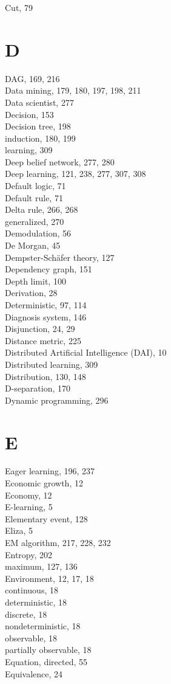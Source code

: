 \documentclass[10pt]{article}
\begin{document}
Cut, 79

\section*{D}
DAG, 169, 216\\
Data mining, 179, 180, 197, 198, 211\\
Data scientist, 277\\
Decision, 153\\
Decision tree, 198\\
induction, 180, 199\\
learning, 309\\
Deep belief network, 277, 280\\
Deep learning, 121, 238, 277, 307, 308\\
Default logic, 71\\
Default rule, 71\\
Delta rule, 266, 268\\
generalized, 270\\
Demodulation, 56\\
De Morgan, 45\\
Dempster-Schäfer theory, 127\\
Dependency graph, 151\\
Depth limit, 100\\
Derivation, 28\\
Deterministic, 97, 114\\
Diagnosis system, 146\\
Disjunction, 24, 29\\
Distance metric, 225\\
Distributed Artificial Intelligence (DAI), 10\\
Distributed learning, 309\\
Distribution, 130, 148\\
D-separation, 170\\
Dynamic programming, 296

\section*{E}
Eager learning, 196, 237\\
Economic growth, 12\\
Economy, 12\\
E-learning, 5\\
Elementary event, 128\\
Eliza, 5\\
EM algorithm, 217, 228, 232\\
Entropy, 202\\
maximum, 127, 136\\
Environment, 12, 17, 18\\
continuous, 18\\
deterministic, 18\\
discrete, 18\\
nondeterministic, 18\\
observable, 18\\
partially observable, 18\\
Equation, directed, 55\\
Equivalence, 24
\end{document}
